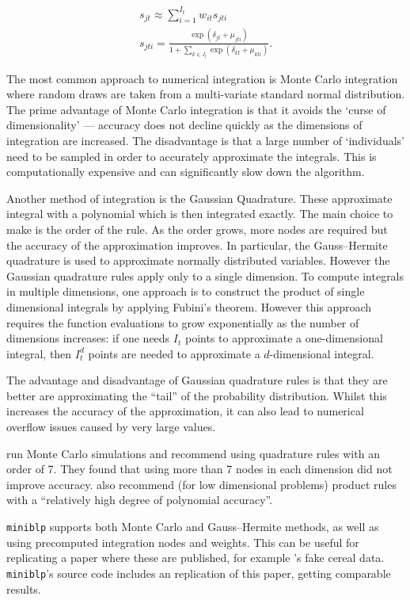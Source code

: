 \documentclass[parskip=half]{scrartcl}
\newcommand{\code}[1]{\texttt{#1}}
\begin{document}
\begin{gather}
s_{jt} \approx \sum_{i=1}^{I_t} w_{it} s_{jti} \\
\label{eq:choice_probabilities}
s_{jti} = \frac{\exp(\delta_{jt} + \mu_{jti})}{1 + \sum_{k \in J_t} \exp(\delta_{kt} + \mu_{kti})}.
\end{gather}

The most common approach to numerical integration is Monte Carlo integration where random draws are taken from a multi-variate standard normal distribution. The prime advantage of Monte Carlo integration is that it avoids the `curse of dimensionality' --- accuracy does not decline quickly as the dimensions of integration are increased. The disadvantage is that a large number of `individuals' need to be sampled in order to accurately approximate the integrals. This is computationally expensive and can significantly slow down the algorithm.

Another method of integration is the Gaussian Quadrature. These approximate integral with a polynomial which is then integrated exactly. The main choice to make is the order of the rule. As the order grows, more nodes are required but the accuracy of the approximation improves. In particular, the Gauss–Hermite quadrature is used to approximate normally distributed variables.
However the Gaussian quadrature rules apply only to a single dimension. To compute integrals in multiple dimensions, one approach is to construct the product of single dimensional integrals by applying Fubini's theorem. However this approach requires the function evaluations to grow exponentially as the number of dimensions increases: if one needs \(I_t\) points to approximate a one-dimensional integral, then \(I_t^d\) points are needed to approximate a \(d\)-dimensional integral.

The advantage and disadvantage of Gaussian quadrature rules is that they are better are approximating the ``tail'' of the probability distribution. Whilst this increases the accuracy of the approximation, it can also lead to numerical overflow issues caused by very large values.

\cite{skrainka2011high} run Monte Carlo simulations and recommend using quadrature rules with an order of 7. They found that using more than 7 nodes in each dimension did not improve accuracy. \cite{conlon2019best} also recommend (for low dimensional problems) product rules with a ``relatively high degree of polynomial accuracy''.

\code{miniblp} supports both Monte Carlo and Gauss–Hermite methods, as well as using precomputed integration nodes and weights. This can be useful for replicating a paper where these are published, for example \cite{nevo2000practitioner}'s fake cereal data. \code{miniblp}'s source code includes an replication of this paper, getting comparable results.
\end{document}
